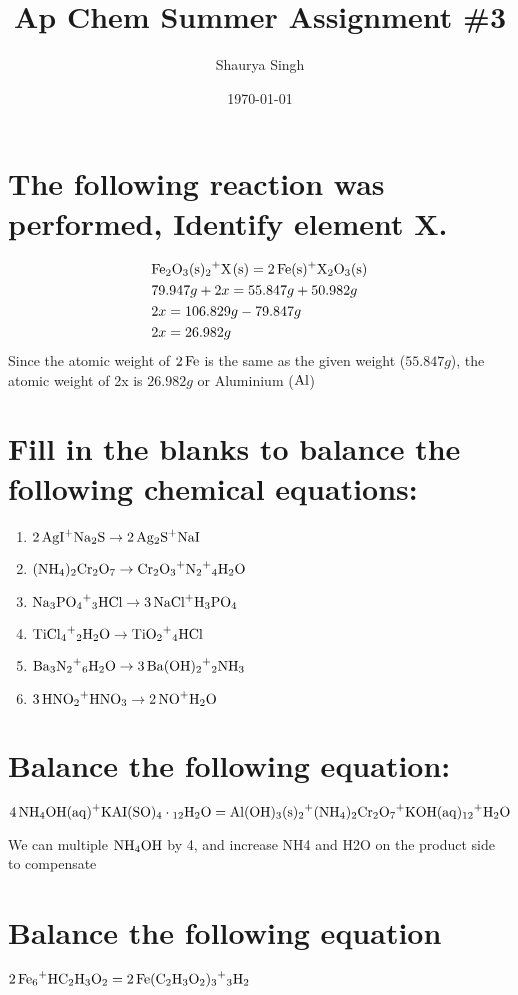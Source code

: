 \documentclass{scrartcl}
\author{Shaurya Singh}
\date{\today}
\title{Ap Chem Summer Assignment \#3}
\begin{document}
\maketitle

\section{The following reaction was performed, Identify element X.}
\label{sec:orga7ddfcb}
\begin{align*}
  &\ce{Fe2O_3(s)+2X(s)} = \ce{2Fe(s)+X_2O_3(s)}\\
  &79.947g+2x=55.847g+50.982g\\
  &2x=106.829g-79.847g\\
  &2x=26.982g\\
\end{align*}
Since the atomic weight of \(\ce{2Fe}\) is the same as the given weight
(\(55.847g\)), the atomic weight of 2x is \(26.982g\) or Aluminium (\(\ce{Al}\))

\section{Fill in the blanks to balance the following chemical equations:}
\label{sec:org6e579ac}
\begin{enumerate}
\item \(\ce{2AgI+Na2S} \rightarrow \ce{2Ag2S+NaI}\)
\item \(\ce{(NH4)2Cr2O7} \rightarrow \ce{Cr2O3+N2+4H2O}\)
\item \(\ce{Na3PO4+3HCl} \rightarrow \ce{3NaCl+H3PO4}\)
\item \(\ce{TiCl4+2H2O} \rightarrow \ce{TiO2+4HCl}\)
\item \(\ce{Ba3N2+6H2O} \rightarrow \ce{3Ba(OH)2+2NH3}\)
\item \(\ce{3HNO2+HNO3} \rightarrow \ce{2NO+H2O}\)
\end{enumerate}

\section{Balance the following equation:}
\label{sec:org295684c}
\(\ce{4NH4OH(aq)+KAI(SO)4\cdot12H2O}=\ce{Al(OH)3(s)+2(NH4)2Cr2O7+KOH(aq)+12H2O}\)

We can multiple \(\ce{NH4OH}\) by 4, and increase NH4 and H2O on the product
side to compensate

\section{Balance the following equation}
\label{sec:orgd1e9c34}
\(\ce{2Fe+6HC2H3O2}=\ce{2Fe(C2H3O2)3+3H2}\)
\end{document}
